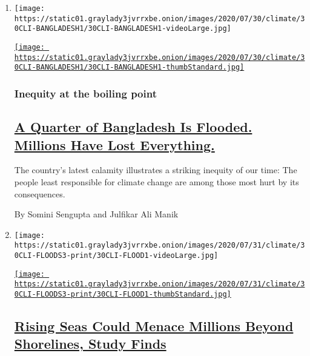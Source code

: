 \begin{enumerate}
\def\labelenumi{\arabic{enumi}.}
\item
  \texttt{[image: https://static01.graylady3jvrrxbe.onion/images/2020/07/30/climate/30CLI-BANGLADESH1/30CLI-BANGLADESH1-videoLarge.jpg]}

  \href{/2020/07/30/climate/bangladesh-floods.html}{\texttt{[image: https://static01.graylady3jvrrxbe.onion/images/2020/07/30/climate/30CLI-BANGLADESH1/30CLI-BANGLADESH1-thumbStandard.jpg]}}

  \hypertarget{inequity-at-the-boiling-point}{%
  \subsubsection{Inequity at the boiling
  point}\label{inequity-at-the-boiling-point}}

  \hypertarget{a-quarter-of-bangladesh-is-flooded-millions-have-lost-everything}{%
  \subsection{\texorpdfstring{\href{/2020/07/30/climate/bangladesh-floods.html}{A
  Quarter of Bangladesh Is Flooded. Millions Have Lost
  Everything.}}{A Quarter of Bangladesh Is Flooded. Millions Have Lost Everything.}}\label{a-quarter-of-bangladesh-is-flooded-millions-have-lost-everything}}

  The country's latest calamity illustrates a striking inequity of our
  time: The people least responsible for climate change are among those
  most hurt by its consequences.

  By Somini Sengupta and Julfikar Ali Manik
\item
  \texttt{[image: https://static01.graylady3jvrrxbe.onion/images/2020/07/31/climate/30CLI-FLOODS3-print/30CLI-FLOOD1-videoLarge.jpg]}

  \href{/2020/07/30/climate/sea-level-inland-floods.html}{\texttt{[image: https://static01.graylady3jvrrxbe.onion/images/2020/07/31/climate/30CLI-FLOODS3-print/30CLI-FLOOD1-thumbStandard.jpg]}}

  \hypertarget{rising-seas-could-menace-millions-beyond-shorelines-study-finds}{%
  \subsection{\texorpdfstring{\href{/2020/07/30/climate/sea-level-inland-floods.html}{Rising
  Seas Could Menace Millions Beyond Shorelines, Study
  Finds}}{Rising Seas Could Menace Millions Beyond Shorelines, Study Finds}}\label{rising-seas-could-menace-millions-beyond-shorelines-study-finds}}


\end{enumerate}
